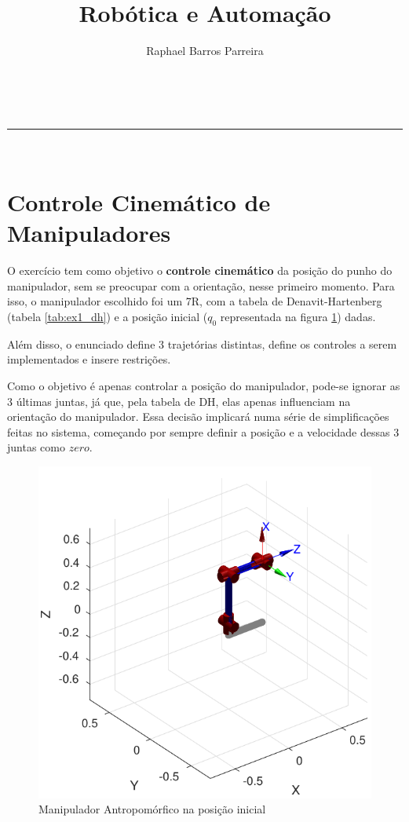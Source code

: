 \documentclass[a4paper,11pt]{article}
\makeatletter
\newcommand{\linia}{\rule{\linewidth}{0.5pt}}
\theoremstyle{mytheor}
\renewcommand{\maketitle}{
\begin{center}
\vspace{2ex}
{\huge \textsc{\@title}}
\vspace{1ex}
\\
\linia\\
\@author \hfill \@date
\vspace{4ex}
\end{center}
}
\makeatother
\begin{document}
\title{Robótica e Automação}

\author{Raphael Barros Parreira}

\date{}

\maketitle

\section{Controle Cinemático de Manipuladores} %

O exercício tem como objetivo o \textbf{controle cinemático} da posição do punho do manipulador, sem se preocupar com a orientação, nesse primeiro momento. Para isso, o manipulador escolhido foi um 7R, com a tabela de Denavit-Hartenberg (tabela \ref{tab:ex1_dh}) e a posição inicial ($q_0$ representada na figura \ref{fig:ex1_ready}) dadas.

Além disso, o enunciado define 3 trajetórias distintas, define os controles a serem implementados e insere restrições.

Como o objetivo é apenas controlar a posição do manipulador, pode-se ignorar as 3 últimas juntas, já que, pela tabela de DH, elas apenas influenciam na orientação do manipulador. Essa decisão implicará numa série de simplificações feitas no sistema, começando por sempre definir a posição e a velocidade dessas 3 juntas como $zero$.


\begin{figure}[!ht]
\centering
\includegraphics[width=1\textwidth]{figs/ex1_ready.pdf}
\caption{Manipulador Antropomórfico na posição inicial}
\label{fig:ex1_ready}
\end{figure}
\end{document}

